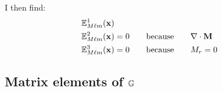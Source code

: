 \documentclass[letterpaper]{article}
\begin{document}
I then find:
\begin{align*}
 \mathbb{E}^1_{M\ell m}(\mathbf{x})
\\
 \mathbb{E}^2_{M\ell m}(\mathbf{x})&=0  \qquad\mbox{because}\qquad \nabla \cdot \mathbf{M}
\\
 \mathbb{E}^3_{M\ell m}(\mathbf{x})&=0  \qquad\mbox{because}\qquad M_r=0
\end{align*}

\subsection{Matrix elements of $\mathbb{G}$}
\end{document}
